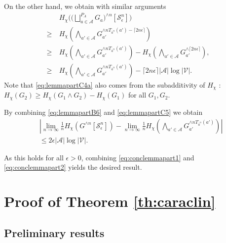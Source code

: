 \documentclass[conference,a4paper]{IEEEtran}
\newtheorem{definition}[theorem]{Definition}
\begin{document}
On the other hand, we obtain with similar arguments
\begin{align}
    & H_\chi\Big(\big(\textstyle\bigsqcup^{P_A}_{a \in \mathcal{A}} G_a\big)^{\wedge n}[\mathcal{S}^n_\epsilon]\Big) \nonumber\\
    \geq \: & H_\chi\left(\textstyle\bigwedge_{a' \in \mathcal{A}} G_{a'}^{\wedge n T_{\overline{a}^n}(a') - \lceil 2 n\epsilon \rceil}\right)\label{eq:lemmapartC3}\\
    \geq \: & H_\chi\left(\textstyle\bigwedge_{a' \in \mathcal{A}} G_{a'}^{\wedge n T_{\overline{a}^n}(a')}\right) - H_\chi\left(\textstyle\bigwedge_{a' \in \mathcal{A}} G_{a'}^{\wedge \lceil 2 n\epsilon\rceil}\right),\label{eq:lemmapartC4a}\\
    \geq \: & H_\chi\left(\textstyle\bigwedge_{a' \in \mathcal{A}} G_{a'}^{\wedge n T_{\overline{a}^n}(a')}\right) - \lceil 2 n\epsilon \rceil|\mathcal{A}|\log|\mathcal{V}|.\label{eq:lemmapartC5}
\end{align}
Note that \eqref{eq:lemmapartC4a} also comes from the subadditivity of $H_\chi$ : $H_\chi(G_2) \geq H_\chi(G_1 \wedge G_2) - H_\chi(G_1)$ for all $G_1, G_2$.

By combining \eqref{eq:lemmapartB6} and \eqref{eq:lemmapartC5} we obtain
\begin{align}
    & \left|\lim_{n \rightarrow \infty} \frac{1}{n} H_\chi(G^{\wedge n}[\mathcal{S}^n_\epsilon]) - \lim_{n \rightarrow \infty} \frac{1}{n} H_\chi\left(\bigwedge_{a' \in \mathcal{A}} G_{a'}^{\wedge n T_{\overline{a}^n}(a')}\right)\right| \nonumber \\
    & \leq 2\epsilon|\mathcal{A}|\log|\mathcal{V}|.\label{eq:conclemmapart2}
\end{align}

As this holds for all $\epsilon > 0$, combining \eqref{eq:conclemmapart1} and \eqref{eq:conclemmapart2} yields the desired result.

\section{Proof of Theorem \ref{th:caraclin}}\label{section:proofmainths}

\subsection{Preliminary results}

\end{document}
